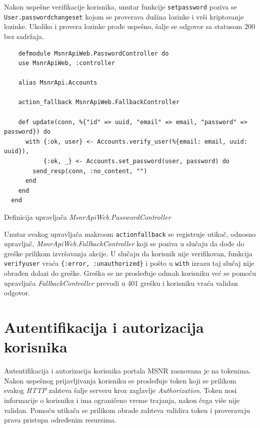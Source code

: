 \documentclass[12pt,oneside]{memoir}
\begin{document}
Nakon uspešne verifikacije korisnika, unutar funkcije \texttt{set{\textunderscore}password} poziva se
\texttt{User.password{\textunderscore}changeset} kojom se proverava dužina lozinke i vrši kriptovanje lozinke.
Ukoliko i provera lozinke prođe uspešno, šalje se odgovor sa statusom 200 bez sadržaja.

\begin{listing}[h!]
  \begin{verbatim}
    defmodule MsnrApiWeb.PasswordController do
    use MsnrApiWeb, :controller
  
    alias MsnrApi.Accounts
  
    action_fallback MsnrApiWeb.FallbackController
  
    def update(conn, %{"id" => uuid, "email" => email, "password" => password}) do
      with {:ok, user} <- Accounts.verify_user(%{email: email, uuid: uuid}),
           {:ok, _} <- Accounts.set_password(user, password) do
        send_resp(conn, :no_content, "")
      end
    end
  end
\end{verbatim}
\caption{Definicija upravljača \emph{MsnrApiWeb.PasswordController}}
\label{listing:password-controller}
\end{listing}

Unutar svakog upravljača makroom \texttt{action{\textunderscore}fallback} se registruje utikač, odnosno upravljač,
\emph{MsnrApiWeb.FallbackController} koji se poziva u slučaju da dođe do greške prilikom izvršavanja akcije.
U slučaju da korisnik nije verifikovan, funkcija \texttt{verify{\textunderscore}user} vraća \texttt{\{:error, :unauthorized\}}
i pošto u \texttt{with} izrazu taj slučaj nije obrađen dolazi do greške. Greška se ne prosleđuje odmah korisniku već
se pomoću upravljača \emph{FallbackController} prevodi u 401 grešku i korisniku vraća validan odgovor. 

\section{Autentifikacija i autorizacija korisnika}
Autentifikacija i autorizacija korisnika portala MSNR zasnovana je na tokenima. Nakon uspešnog prijavljivanja korisniku
se prosleđuje token koji se prilikom svakog \emph{HTTP} zahteva šalje serveru kroz zaglavlje \emph{Authorization}.
Token nosi informacije o korisniku i ima ograničeno vreme trajanja, nakon čega više nije validan.
Pomoću utikača se prilikom obrade zahteva validira token i proveravaju prava pristupa određenim resursima.
\end{document}
